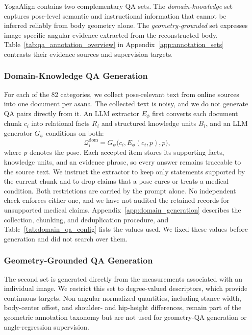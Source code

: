 \documentclass[conference]{IEEEtran}
\begin{document}
YogaAlign contains two complementary QA sets.
The \emph{domain-knowledge} set captures pose-level semantic and instructional information that cannot be inferred reliably from body geometry alone.
The \emph{geometry-grounded} set expresses image-specific angular evidence extracted from the reconstructed body.
Table~\ref{tab:qa_annotation_overview} in Appendix~\ref{app:annotation_sets} contrasts their evidence sources and supervision targets.


\subsubsection{Domain-Knowledge QA Generation}
\label{subsubsec:domain_qa_generation}

For each of the 82 categories, we collect pose-relevant text from online sources into one document per asana.
The collected text is noisy, and we do not generate QA pairs directly from it.
An LLM extractor $E_{\phi}$ first converts each document chunk $c_i$ into relational facts $R_i$ and structured knowledge units $B_i$, and an LLM generator $G_{\psi}$ conditions on both:
\begin{equation}
\mathcal{Q}^{\mathrm{dom}}_i=G_{\psi}\bigl(c_i,E_{\phi}(c_i,p),p\bigr),
\label{eq:domain_qa}
\end{equation}
where $p$ denotes the pose.
Each accepted item stores its supporting facts, knowledge units, and an evidence phrase, so every answer remains traceable to the source text.
We instruct the extractor to keep only statements supported by the current chunk and to drop claims that a pose cures or treats a medical condition.
Both restrictions are carried by the prompt alone.
No independent check enforces either one, and we have not audited the retained records for unsupported medical claims.
Appendix~\ref{app:domain_generation} describes the collection, chunking, and deduplication procedure, and Table~\ref{tab:domain_qa_config} lists the values used.
We fixed these values before generation and did not search over them.

\subsubsection{Geometry-Grounded QA Generation}
\label{subsubsec:geometry_qa_generation}

The second set is generated directly from the measurements associated with an individual image.
We restrict this set to degree-valued descriptors, which provide continuous targets.
Non-angular normalized quantities, including stance width, body-center offset, and shoulder- and hip-height differences, remain part of the geometric annotation taxonomy but are not used for geometry-QA generation or angle-regression supervision.
\end{document}
